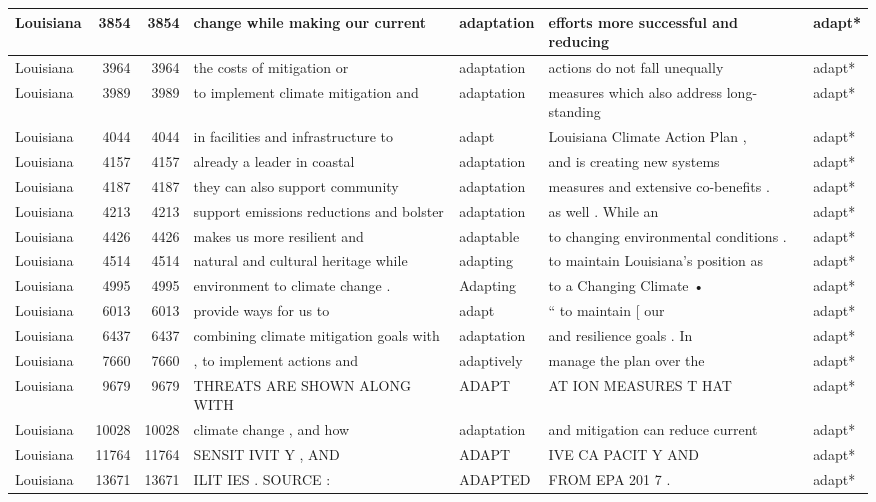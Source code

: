 \documentclass[
]{article}
\begin{document}
\begin{table}
\begin{tabular}[t]{l|r|r|l|l|l|l}
\hline
Louisiana & 3854 & 3854 & change while making our current & adaptation & efforts more successful and reducing & adapt*\\
\hline
Louisiana & 3964 & 3964 & the costs of mitigation or & adaptation & actions do not fall unequally & adapt*\\
\hline
Louisiana & 3989 & 3989 & to implement climate mitigation and & adaptation & measures which also address long-standing & adapt*\\
\hline
Louisiana & 4044 & 4044 & in facilities and infrastructure to & adapt & Louisiana Climate Action Plan , & adapt*\\
\hline
Louisiana & 4157 & 4157 & already a leader in coastal & adaptation & and is creating new systems & adapt*\\
\hline
Louisiana & 4187 & 4187 & they can also support community & adaptation & measures and extensive co-benefits . & adapt*\\
\hline
Louisiana & 4213 & 4213 & support emissions reductions and bolster & adaptation & as well . While an & adapt*\\
\hline
Louisiana & 4426 & 4426 & makes us more resilient and & adaptable & to changing environmental conditions . & adapt*\\
\hline
Louisiana & 4514 & 4514 & natural and cultural heritage while & adapting & to maintain Louisiana’s position as & adapt*\\
\hline
Louisiana & 4995 & 4995 & environment to climate change . & Adapting & to a Changing Climate • & adapt*\\
\hline
Louisiana & 6013 & 6013 & provide ways for us to & adapt & “ to maintain [ our & adapt*\\
\hline
Louisiana & 6437 & 6437 & combining climate mitigation goals with & adaptation & and resilience goals . In & adapt*\\
\hline
Louisiana & 7660 & 7660 & , to implement actions and & adaptively & manage the plan over the & adapt*\\
\hline
Louisiana & 9679 & 9679 & THREATS ARE SHOWN ALONG WITH & ADAPT & AT ION MEASURES T HAT & adapt*\\
\hline
Louisiana & 10028 & 10028 & climate change , and how & adaptation & and mitigation can reduce current & adapt*\\
\hline
Louisiana & 11764 & 11764 & SENSIT IVIT Y , AND & ADAPT & IVE CA PACIT Y AND & adapt*\\
\hline
Louisiana & 13671 & 13671 & ILIT IES . SOURCE : & ADAPTED & FROM EPA 201 7 . & adapt*\\

\end{tabular}
\end{table}
\end{document}
